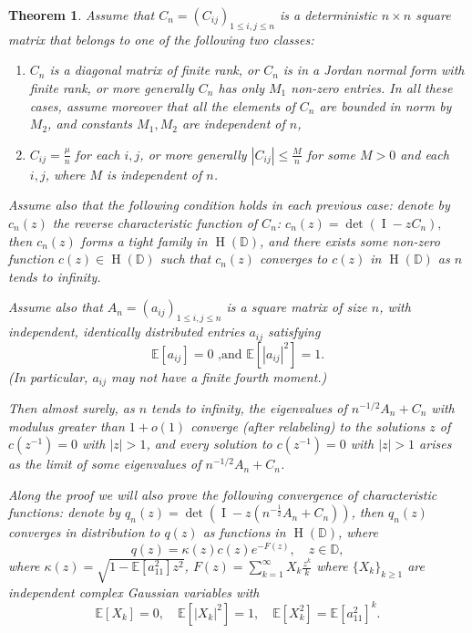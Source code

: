 \documentclass[12pt, reqno]{amsart}
\newtheorem{theorem}{Theorem}[section]
\theoremstyle{definition}
\theoremstyle{remark}
\numberwithin{equation}{section}
\begin{document}
\begin{theorem}\label{theorem1} Assume that $C_n=(C_{ij})_{1\leq i,j\leq n}$ is a deterministic $n\times n$ square matrix that belongs to one of the following two classes:
\begin{enumerate}
    \item $C_n$ is a diagonal matrix of finite rank, or $C_n$ is in a Jordan normal form with finite rank, or more generally $C_n$ has only $M_1$ non-zero entries. In all these cases, assume moreover that all the elements of $C_n$ are bounded in norm by $M_2$, and constants $M_1,M_2$ are independent of $n$,
    \item $C_{ij}=\frac{\mu}{n}$ for each $i,j$, or more generally $|C_{ij}|\leq \frac{M}{n}$ for some $M>0$ and each $i,j$, where $M$ is independent of $n$.
\end{enumerate}
Assume also that the following condition holds in each previous case: denote by $c_n(z)$ the reverse characteristic function of $C_n$: $c_n(z)=\det(\operatorname{I}-zC_n),$ then $c_n(z)$ forms a tight family in $\operatorname{H}(\mathbb{D})$, and there exists some non-zero function $c(z)\in \operatorname{H}(\mathbb{D})$ such that $c_n(z)$ converges to $c(z)$ in $\operatorname{H}(\mathbb{D})$ as $n$ tends to infinity.


Assume also that $A_n=(a_{ij})_{1\leq i,j\leq n}$ is a square matrix of size $n$, with independent, identically distributed entries $a_{ij}$ satisfying \begin{equation}\label{firstcondition12}\mathbb{E}[a_{ij}]=0 \text{ ,and } \mathbb{E}[|a_{ij}|^2]=1.\end{equation}
(In particular, $a_{ij}$ may not have a finite fourth moment.)


    Then almost surely, as $n$ tends to infinity, the eigenvalues of $n^{-1/2}A_n+C_n$ with modulus greater than $1+o(1)$ converge (after relabeling) to the solutions $z$ of $c(z^{-1})=0$ with $|z|>1$, and every solution to $c(z^{-1})=0$ with $|z|>1$ arises as the limit of some eigenvalues of $n^{-1/2}A_n+C_n$.

    Along the proof we will also prove the following convergence of characteristic functions: denote by $q_n(z)=\det(\operatorname{I}-z(n^{-\frac{1}{2}}A_n+C_n))$, then $q_n(z)$ converges in distribution to $q(z)$ as functions in $\operatorname{H}(\mathbb{D})$, where 
    \begin{equation}
        q(z)=\kappa(z)c(z)e^{-F(z)},\quad z\in\mathbb{D},
    \end{equation} 
    where $\kappa(z)=\sqrt{1-\mathbb{E}[a_{11}^2]z^2}$, $F(z)=\sum_{k=1}^\infty X_k\frac{z^k}{k} 
$ where $\{X_k\}_{k\geq 1}$ are independent complex Gaussian variables with 
$$
\mathbb{E}[X_k]=0,\quad \mathbb{E}[|X_k|^2]=1,\quad \mathbb{E}[X_k^2]=\mathbb{E}[a_{11}^2]^k.
$$
\end{theorem}
\end{document}
